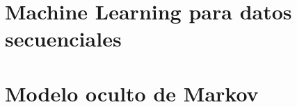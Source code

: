 

\section{Machine Learning para datos secuenciales}\label{ch2:sec-machinelearning-seq-data}
 




\section{Modelo oculto de Markov}\label{ch2:sec-hmm}
 
